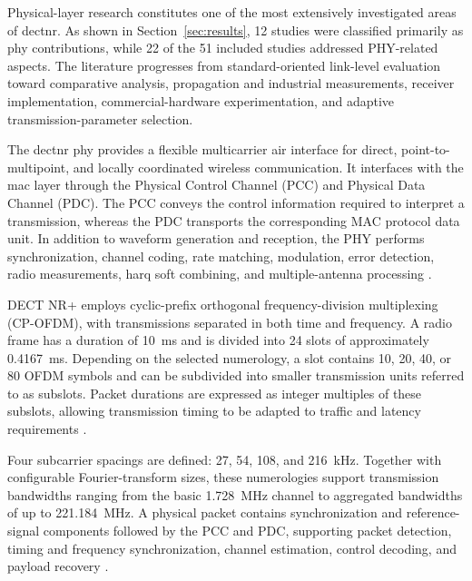 Physical-layer research constitutes one of the most extensively investigated
areas of \gls{dectnr}. As shown in Section~\ref{sec:results}, 12 studies were
classified primarily as \gls{phy} contributions, while 22 of the 51 included
studies addressed PHY-related aspects. The literature progresses from
standard-oriented link-level evaluation toward comparative analysis,
propagation and industrial measurements, receiver implementation,
commercial-hardware experimentation, and adaptive transmission-parameter
selection.

The \gls{dectnr} \gls{phy} provides a flexible multicarrier air interface for
direct, point-to-multipoint, and locally coordinated wireless communication.
It interfaces with the \gls{mac} layer through the Physical Control Channel
(PCC) and Physical Data Channel (PDC). The PCC conveys the control information
required to interpret a transmission, whereas the PDC transports the
corresponding MAC protocol data unit. In addition to waveform generation and
reception, the PHY performs synchronization, channel coding, rate matching,
modulation, error detection, radio measurements, \gls{harq} soft combining,
and multiple-antenna processing
\cite{etsi_ts103636_3,etsi_ts_103636_1_r2,etsi_ts_103636_3_r2}.

DECT NR+ employs cyclic-prefix orthogonal frequency-division multiplexing
(CP-OFDM), with transmissions separated in both time and frequency. A radio
frame has a duration of 10~ms and is divided into 24 slots of approximately
0.4167~ms. Depending on the selected numerology, a slot contains 10, 20, 40,
or 80 OFDM symbols and can be subdivided into smaller transmission units
referred to as subslots. Packet durations are expressed as integer multiples
of these subslots, allowing transmission timing to be adapted to traffic and
latency requirements
\cite{etsi_ts103636_3,etsi_ts_103636_3_r2}.

Four subcarrier spacings are defined: 27, 54, 108, and 216~kHz. Together with
configurable Fourier-transform sizes, these numerologies support transmission
bandwidths ranging from the basic 1.728~MHz channel to aggregated bandwidths
of up to 221.184~MHz. A physical packet contains synchronization and
reference-signal components followed by the PCC and PDC, supporting packet
detection, timing and frequency synchronization, channel estimation, control
decoding, and payload recovery
\cite{etsi_ts_103636_3_r2}.

